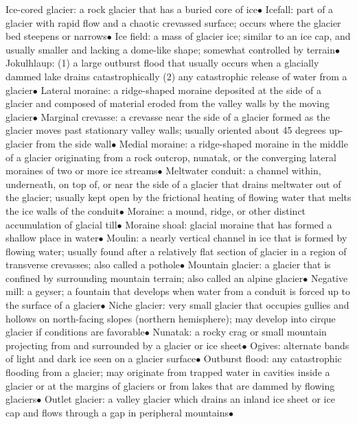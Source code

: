 \documentclass{article}
\newcommand{\ddd}{$\bullet$}
\begin{document}
\begin{multicols*}{4}
        Ice-cored glacier: a rock glacier that has a buried core of ice\ddd
        Icefall: part of a glacier with rapid flow and a chaotic crevassed surface; occurs where the glacier bed steepens or narrows\ddd
        Ice field: a mass of glacier ice; similar to an ice cap, and usually smaller and lacking a dome-like shape; somewhat controlled by terrain\ddd
        Jokulhlaup: (1) a large outburst flood that usually occurs when a glacially dammed lake drains catastrophically (2) any catastrophic release of water from a glacier\ddd
        Lateral moraine: a ridge-shaped moraine deposited at the side of a glacier and composed of material eroded from the valley walls by the moving glacier\ddd
        Marginal crevasse: a crevasse near the side of a glacier formed as the glacier moves past stationary valley walls; usually oriented about 45 degrees up-glacier from the side wall\ddd
        Medial moraine: a ridge-shaped moraine in the middle of a glacier originating from a rock outcrop, nunatak, or the converging lateral moraines of two or more ice streams\ddd
        Meltwater conduit: a channel within, underneath, on top of, or near the side of a glacier that drains meltwater out of the glacier; usually kept open by the frictional heating of flowing water that melts the ice walls of the conduit\ddd
        Moraine: a mound, ridge, or other distinct accumulation of glacial till\ddd
        Moraine shoal: glacial moraine that has formed a shallow place in water\ddd
        Moulin: a nearly vertical channel in ice that is formed by flowing water; usually found after a relatively flat section of glacier in a region of transverse crevasses; also called a pothole\ddd
        Mountain glacier: a glacier that is confined by surrounding mountain terrain; also called an alpine glacier\ddd
        Negative mill: a geyser; a fountain that develops when water from a conduit is forced up to the surface of a glacier\ddd
        Niche glacier: very small glacier that occupies gullies and hollows on north-facing slopes (northern hemisphere); may develop into cirque glacier if conditions are favorable\ddd
        Nunatak: a rocky crag or small mountain projecting from and surrounded by a glacier or ice sheet\ddd
        Ogives: alternate bands of light and dark ice seen on a glacier surface\ddd
        Outburst flood: any catastrophic flooding from a glacier; may originate from trapped water in cavities inside a glacier or at the margins of glaciers or from lakes that are dammed by flowing glaciers\ddd
        Outlet glacier: a valley glacier which drains an inland ice sheet or ice cap and flows through a gap in peripheral mountains\ddd

\end{multicols*}
\end{document}
